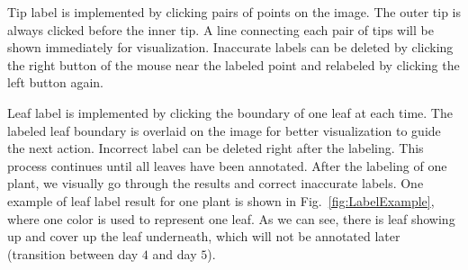 Tip label is implemented by clicking pairs of points on the image.
The outer tip is always clicked before the inner tip.
A line connecting each pair of tips will be shown immediately for visualization.
Inaccurate labels can be deleted by clicking the right button of the mouse near the labeled point and relabeled by clicking the left button again.

Leaf label is implemented by clicking the boundary of one leaf at each time.
The labeled leaf boundary is overlaid on the image for better visualization to guide the next action.
Incorrect label can be deleted right after the labeling.
This process continues until all leaves have been annotated.
After the labeling of one plant, we visually go through the results and correct inaccurate labels.
One example of leaf label result for one plant is shown in Fig.~\ref{fig:LabelExample}, where one color is used to represent one leaf.
As we can see, there is leaf showing up and cover up the leaf underneath, which will not be annotated later (transition between day $4$ and day $5$).




